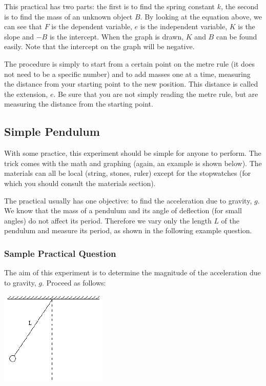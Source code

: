 This practical has two parts: the first is to find the spring constant $k$, the second is
to find the mass of an unknown object $B$. By looking at the equation above, we
can see that $F$ is the dependent variable, $e$ is the independent variable, $K$ is the slope and
$-B$ is the intercept. When the graph is drawn, $K$ and $B$ can be found easily. Note that the
intercept on the graph will be negative.

The procedure is simply to start from a certain point on the metre rule (it does not
need to be a specific number) and to add masses one at a time, measuring the distance
from your starting point to the new position. This distance is called the extension, $e$. Be
sure that you are not simply reading the metre rule, but are measuring the distance from
the starting point.

\subsection{Simple Pendulum}  

With some practice, this experiment should be simple for anyone to perform. The
trick comes with the math and graphing (again, an example is shown below). The
materials can all be local (string, stones, ruler) except for the stopwatches (for which you
should consult the materials section).

The practical usually has one objective: to find the acceleration due to gravity, $g$.
We know that the mass of a pendulum and its angle of deflection (for small angles) do
not affect its period. Therefore we vary only the length $L$ of the pendulum and measure
its period, as shown in the following example question.

\subsubsection{Sample Practical Question}

The aim of this experiment is to determine the magnitude of the acceleration due to
gravity, $g$. Proceed as follows:

\begin{center}
\includegraphics{./img/pendulum.png}
\end{center}


